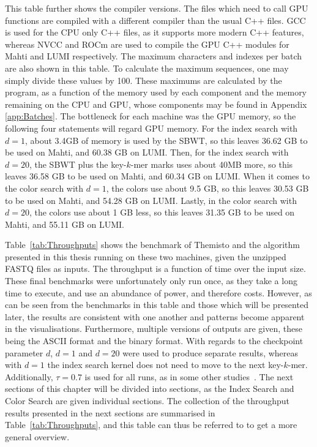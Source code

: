 This table further shows the compiler versions.
The files which need to call GPU functions are compiled with a different compiler than the usual C++ files.
GCC is used for the CPU only C++ files, as it supports more modern C++ features, whereas NVCC and ROCm are used to compile the GPU C++ modules for Mahti and LUMI respectively.
The maximum characters and indexes per batch are also shown in this table.
To calculate the maximum sequences, one may simply divide these values by 100.
These maximums are calculated by the program, as a function of the memory used by each component and the memory remaining on the CPU and GPU, whose components may be found in Appendix \ref{app:Batches}.
The bottleneck for each machine was the GPU memory, so the following four statements will regard GPU memory.
For the index search with $d=1$, about 3.4GB of memory is used by the SBWT, so this leaves 36.62 GB to be used on Mahti, and 60.38 GB on LUMI.
Then, for the index search with $d=20$, the SBWT plus the key-$k$-mer marks uses about 40MB more, so this leaves 36.58 GB to be used on Mahti, and 60.34 GB on LUMI.
When it comes to the color search with $d=1$, the colors use about 9.5 GB, so this leaves 30.53 GB to be used on Mahti, and 54.28 GB on LUMI.
Lastly, in the color search with $d=20$, the colors use about 1 GB less, so this leaves 31.35 GB to be used on Mahti, and 55.11 GB on LUMI.

Table~\ref{tab:Throughputs} shows the benchmark of Themisto and the algorithm presented in this thesis running on these two machines, given the unzipped FASTQ files as inputs.
The throughput is a function of time over the input size.
These final benchmarks were unfortunately only run once, as they take a long time to execute, and use an abundance of power, and therefore costs.
However, as can be seen from the benchmarks in this table and those which will be presented later, the results are consistent with one another and patterns become apparent in the visualisations.
Furthermore, multiple versions of outputs are given, these being the ASCII format and the binary format.
With regards to the checkpoint parameter $d$, $d=1$ and $d=20$ were used to produce separate results, whereas with $d=1$ the index search kernel does not need to move to the next key-$k$-mer.
Additionally, $\tau=0.7$ is used for all runs, as in some other studies~\cite{Themisto, Metagraph}.
The next sections of this chapter will be divided into sections, as the Index Search and Color Search are given individual sections.
The collection of the throughput results presented in the next sections are summarised in Table~\ref{tab:Throughputs}, and this table can thus be referred to to get a more general overview.

